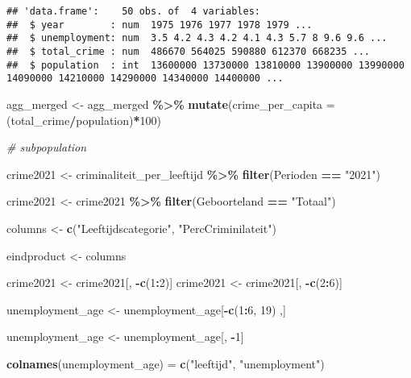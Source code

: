 \documentclass[
]{article}
\newenvironment{Shaded}{\begin{snugshade}}{\end{snugshade}}
\newcommand{\AttributeTok}[1]{\textcolor[rgb]{0.13,0.29,0.53}{#1}}
\newcommand{\CommentTok}[1]{\textcolor[rgb]{0.56,0.35,0.01}{\textit{#1}}}
\newcommand{\DecValTok}[1]{\textcolor[rgb]{0.00,0.00,0.81}{#1}}
\newcommand{\FunctionTok}[1]{\textcolor[rgb]{0.13,0.29,0.53}{\textbf{#1}}}
\newcommand{\NormalTok}[1]{#1}
\newcommand{\OtherTok}[1]{\textcolor[rgb]{0.56,0.35,0.01}{#1}}
\newcommand{\SpecialCharTok}[1]{\textcolor[rgb]{0.81,0.36,0.00}{\textbf{#1}}}
\newcommand{\StringTok}[1]{\textcolor[rgb]{0.31,0.60,0.02}{#1}}
\begin{document}
\begin{verbatim}
## 'data.frame':    50 obs. of  4 variables:
##  $ year        : num  1975 1976 1977 1978 1979 ...
##  $ unemployment: num  3.5 4.2 4.3 4.2 4.1 4.3 5.7 8 9.6 9.6 ...
##  $ total_crime : num  486670 564025 590880 612370 668235 ...
##  $ population  : int  13600000 13730000 13810000 13900000 13990000 14090000 14210000 14290000 14340000 14400000 ...
\end{verbatim}

\begin{Shaded}
\begin{Highlighting}[]
\NormalTok{agg\_merged }\OtherTok{\textless{}{-}}\NormalTok{ agg\_merged }\SpecialCharTok{\%\textgreater{}\%}
  \FunctionTok{mutate}\NormalTok{(}\AttributeTok{crime\_per\_capita =}\NormalTok{ (total\_crime}\SpecialCharTok{/}\NormalTok{population)}\SpecialCharTok{*}\DecValTok{100}\NormalTok{)}

\CommentTok{\# subpopulation}

\NormalTok{crime2021 }\OtherTok{\textless{}{-}}\NormalTok{ criminaliteit\_per\_leeftijd }\SpecialCharTok{\%\textgreater{}\%} \FunctionTok{filter}\NormalTok{(Perioden }\SpecialCharTok{==} \StringTok{"2021"}\NormalTok{)}

\NormalTok{crime2021 }\OtherTok{\textless{}{-}}\NormalTok{ crime2021 }\SpecialCharTok{\%\textgreater{}\%} \FunctionTok{filter}\NormalTok{(Geboorteland }\SpecialCharTok{==} \StringTok{"Totaal"}\NormalTok{)}

\NormalTok{columns }\OtherTok{\textless{}{-}} \FunctionTok{c}\NormalTok{(}\StringTok{"Leeftijdscategorie"}\NormalTok{, }\StringTok{"PercCriminilateit"}\NormalTok{)}

\NormalTok{eindproduct }\OtherTok{\textless{}{-}}\NormalTok{ columns}

\NormalTok{crime2021 }\OtherTok{\textless{}{-}}\NormalTok{ crime2021[, }\SpecialCharTok{{-}}\FunctionTok{c}\NormalTok{(}\DecValTok{1}\SpecialCharTok{:}\DecValTok{2}\NormalTok{)]}
\NormalTok{crime2021 }\OtherTok{\textless{}{-}}\NormalTok{ crime2021[, }\SpecialCharTok{{-}}\FunctionTok{c}\NormalTok{(}\DecValTok{2}\SpecialCharTok{:}\DecValTok{6}\NormalTok{)]}

\NormalTok{unemployment\_age }\OtherTok{\textless{}{-}}\NormalTok{ unemployment\_age[}\SpecialCharTok{{-}}\FunctionTok{c}\NormalTok{(}\DecValTok{1}\SpecialCharTok{:}\DecValTok{6}\NormalTok{, }\DecValTok{19}\NormalTok{) ,]}

\NormalTok{unemployment\_age }\OtherTok{\textless{}{-}}\NormalTok{ unemployment\_age[, }\SpecialCharTok{{-}}\DecValTok{1}\NormalTok{]}

\FunctionTok{colnames}\NormalTok{(unemployment\_age) }\OtherTok{=} \FunctionTok{c}\NormalTok{(}\StringTok{"leeftijd"}\NormalTok{, }\StringTok{"unemployment"}\NormalTok{)}
\end{Highlighting}
\end{Shaded}
\end{document}
